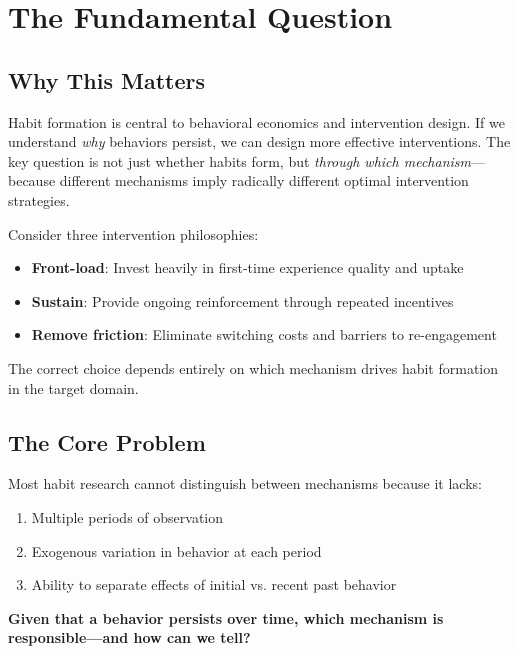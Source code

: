 \section{The Fundamental Question}
\label{sec:hf-fundamental}

\subsection{Why This Matters}

Habit formation is central to behavioral economics and intervention design. If we understand
\textit{why} behaviors persist, we can design more effective interventions. The key question
is not just whether habits form, but \textit{through which mechanism}---because different
mechanisms imply radically different optimal intervention strategies.

Consider three intervention philosophies:
\begin{itemize}
\item \textbf{Front-load}: Invest heavily in first-time experience quality and uptake
\item \textbf{Sustain}: Provide ongoing reinforcement through repeated incentives
\item \textbf{Remove friction}: Eliminate switching costs and barriers to re-engagement
\end{itemize}

The correct choice depends entirely on which mechanism drives habit formation in the target domain.

\subsection{The Core Problem}

Most habit research cannot distinguish between mechanisms because it lacks:
\begin{enumerate}
\item Multiple periods of observation
\item Exogenous variation in behavior at each period
\item Ability to separate effects of initial vs. recent past behavior
\end{enumerate}

\begin{tcolorbox}[colback=red!5!white, colframe=red!75!black,
    title=The Fundamental Question]
\textbf{Given that a behavior persists over time, which mechanism is responsible---and how can we tell?}
\end{tcolorbox}



